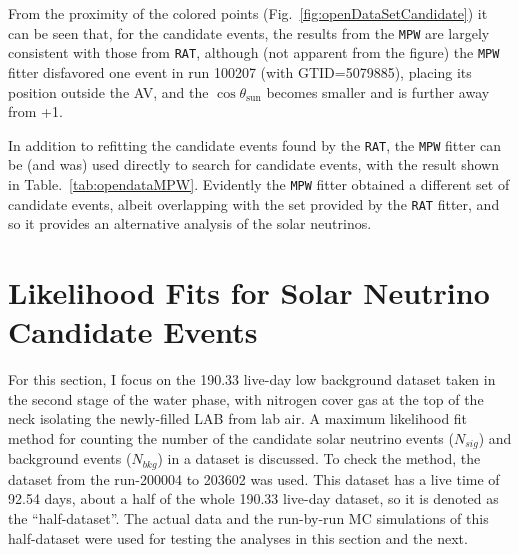 From the proximity of the colored points (Fig.~\ref{fig:openDataSetCandidate}) it can be seen that, for the candidate events, the results from the \texttt{MPW} are largely consistent with those from \texttt{RAT}, although (not apparent from the figure) the \texttt{MPW} fitter disfavored one event in run 100207 (with GTID=5079885), placing its position outside the AV, and the $\cos\theta_\mathrm{sun}$ becomes smaller and is further away from +1. %

In addition to refitting the candidate events found by the \texttt{RAT}, the \texttt{MPW} fitter can be (and was) used directly to search for candidate events, with the result shown in Table.~\ref{tab:opendataMPW}. Evidently the \texttt{MPW} fitter obtained a different set of candidate events, albeit overlapping with the set provided by the \texttt{RAT} fitter, and so it provides an alternative analysis of the solar neutrinos.

\section{Likelihood Fits for Solar Neutrino Candidate Events}

For this section, I focus on the 190.33 live-day low background dataset taken in the second stage of the water phase, with nitrogen cover gas at the top of the neck isolating the newly-filled LAB from lab air. A maximum likelihood fit method for counting the number of the candidate solar neutrino events ($N_{sig}$) and background events ($N_{bkg}$) in a dataset is discussed. To check the method, the dataset from the run-200004 to 203602 was used. This dataset has a live time of 92.54 days, about a half of the whole 190.33 live-day dataset, so it is denoted as the ``half-dataset''. The actual data and the run-by-run MC simulations of this half-dataset were used for testing the analyses in this section and the next.

